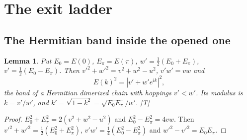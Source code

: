 \documentclass[11pt]{article}
\newtheorem{lemma}[theorem]{Lemma}
\theoremstyle{definition}
\newcommand{\grade}[1]{\textsf{\small[#1]}}
\begin{document}
\section{The exit ladder}\label{sec:ladder}
\subsection{The Hermitian band inside the opened one}
\begin{lemma}\label{lem:band}
Put $E_0=E(0)$, $E_\pi=E(\pi)$, $w'=\tfrac12(E_0+E_\pi)$, $v'=\tfrac12(E_0-E_\pi)$. Then $v'^2+w'^2=v^2+w^2-u^2$, $v'w'=vw$ and
\[
E(k)^2=|v'+w'e^{ik}|^2,
\]
the band of a Hermitian dimerized chain with hoppings $v'<w'$. Its modulus is $k=v'/w'$, and $k'=\sqrt{1-k^2}=\sqrt{E_0E_\pi}/w'$. \grade{T}
\end{lemma}
\begin{proof}
$E_0^2+E_\pi^2=2(v^2+w^2-u^2)$ and $E_0^2-E_\pi^2=4vw$. Then $v'^2+w'^2=\tfrac12(E_0^2+E_\pi^2)$, $v'w'=\tfrac14(E_0^2-E_\pi^2)$ and $w'^2-v'^2=E_0E_\pi$.
\end{proof}
\end{document}
